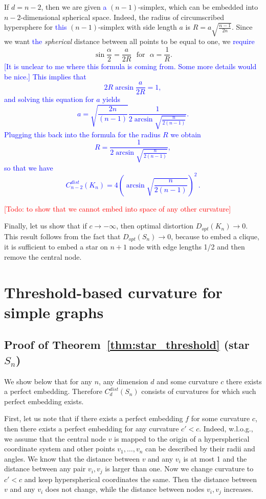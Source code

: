 \documentclass{article} %
\newcommand{\ph}[1]{\textcolor{blue}{#1}}
\begin{document}
If $d = n-2$, then we are given \ph{a} $(n-1)$-simplex, which can be embedded into $n-2$-dimensional spherical space. Indeed, the radius of circumscribed hypersphere for \ph{this} $(n-1)$-simplex with side length $a$ is $R = a\sqrt{\frac{n-1}{2n}}$. Since we want \ph{the} \textit{spherical} distance between all points to be equal to one, we \ph{require}
\[
\sin \frac{\alpha}{2} = \frac{a}{2R} \,\,\text{ for } \,\,\alpha = \frac{1}{R}.
\]
\ph{[It is unclear to me where this formula is coming from. Some more details would be nice.]}
\ph{This implies that
\[
2 R \arcsin \frac{a}{2R} = 1,
\]
and solving this equation for $a$ yields
\[
a  = \sqrt{\frac{2n}{(n-1)}}\frac{1}{2\arcsin \sqrt{\frac{n}{2(n-1)}}}.
\]
Plugging this back into the formula for the radius $R$ we obtain
\[
R = \frac{1}{2\arcsin \sqrt{\frac{n}{2(n-1)}}},
\]
so that we have
\[
C_{n-2}^{dist}(K_n) = 4 \left(\arcsin \sqrt{\frac{n}{2(n-1)}}\right)^2\,.
\]
}

\textcolor{red}{[Todo: to show that we cannot embed into space of any other curvature]}

Finally, let us show that if $c \to -\infty$, then optimal distortion $D_{opt}(K_n) \to 0$. This result follows from the fact that $D_{opt}(S_n) \to 0$, because to embed a clique, it is sufficient to embed a star on $n+1$ node with edge lengths 1/2 and then remove the central node. 

\section{Threshold-based curvature for simple graphs}

\subsection{Proof of Theorem~\ref{thm:star_threshold} (star $S_n$)}

We show below that for any $n$, any dimension $d$ and some curvature $c$ there exists a perfect embedding.
Therefore $C_d^{dist}(S_n)$ consists of curvatures for which such perfect embedding exists. 

First, let us note that if there exists a perfect embedding $f$ for some curvature $c$, then there exists a perfect embedding for any curvature $c' < c$. Indeed, w.l.o.g., we assume that the central node $v$ is mapped to the origin of a hyperspherical coordinate system and other points $v_1, \ldots, v_n$ can be described by their radii and angles. We know that the distance between $v$ and any $v_i$ is at most 1 and the distance between any pair $v_i, v_j$ is larger than one. Now we change curvature to $c' < c$ and keep hyperspherical coordinates the same. Then the distance between $v$ and any $v_i$ does not change, while the distance between nodes $v_i, v_j$ increases.
\end{document}
